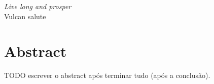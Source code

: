 \documentclass[12pt,twoside,openright]{report}
\begin{document}
\chapter*{}
\vfill
\begin{flushright}
    \textit{Live long and prosper}\\
    \baselineskip
    Vulcan salute
\end{flushright}
\vfill

\chapter*{Abstract}
TODO escrever o abstract após terminar tudo (após a conclusão).\\

\tableofcontents

















\appendix




\printbibliography
\end{document}
